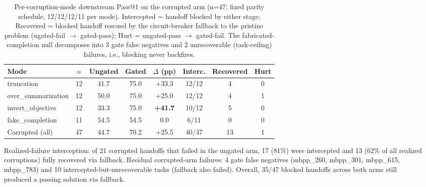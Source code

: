 \begin{table}[t]
\centering
\small
\caption{Per-corruption-mode downstream Pass@1 on the corrupted arm (n=47; fixed parity schedule, 12/12/12/11 per mode). Intercepted = handoff blocked by either stage; Recovered = blocked handoff rescued by the circuit-breaker fallback to the pristine problem (ugated-fail $\rightarrow$ gated-pass); Hurt = ungated-pass $\rightarrow$ gated-fail. The fabricated-completion null decomposes into 3 gate false negatives and 2 unrecoverable (task-ceiling) failures, i.e., blocking never backfires.}
\label{tab:downstream_types}
\begin{tabular}{lccccccc}
\toprule
\textbf{Mode} & \textbf{$n$} & \textbf{Ungated} & \textbf{Gated} & \textbf{$\Delta$ (pp)} & \textbf{Interc.} & \textbf{Recovered} & \textbf{Hurt} \\
\midrule
truncation & 12 & 41.7 & 75.0 & +33.3 & 12/12 & 4 & 0 \\
over\_summarization & 12 & 50.0 & 75.0 & +25.0 & 12/12 & 4 & 1 \\
invert\_objective & 12 & 33.3 & 75.0 & \textbf{+41.7} & 10/12 & 5 & 0 \\
fake\_completion & 11 & 54.5 & 54.5 & 0.0 & 6/11 & 0 & 0 \\
\midrule
Corrupted (all) & 47 & 44.7 & 70.2 & +25.5 & 40/47 & 13 & 1 \\
\bottomrule
\end{tabular}
\vspace{-2pt}
\begin{flushleft}\small
Realized-failure interception: of 21 corrupted handoffs that failed in the ungated arm, 17 (81\%) were intercepted and 13 (62\% of all realized corruptions) fully recovered via fallback. Residual corrupted-arm failures: 4 gate false negatives (mbpp\_260, mbpp\_301, mbpp\_615, mbpp\_783) and 10 intercepted-but-unrecoverable tasks (fallback also failed). Overall, 35/47 blocked handoffs across both arms still produced a passing solution via fallback.
\end{flushleft}
\end{table}